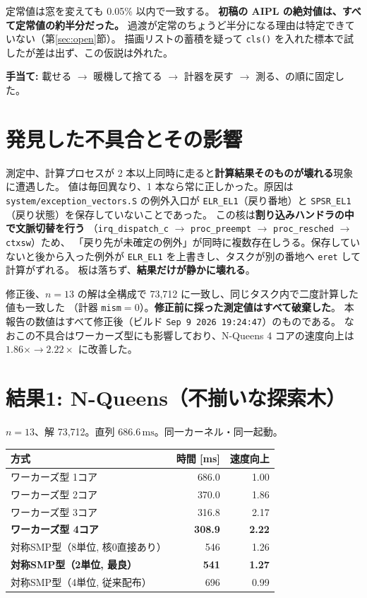 \documentclass[a4paper,11pt]{ltjsarticle}
\begin{document}
\noindent
定常値は窓を変えても 0.05\% 以内で一致する。
\textbf{初稿の AIPL の絶対値は、すべて定常値の約半分だった。}
過渡が定常のちょうど半分になる理由は特定できていない（第\ref{sec:open}節）。
描画リストの蓄積を疑って \texttt{cls()} を入れた標本で試したが差は出ず、この仮説は外れた。

\textbf{手当て:} 載せる $\to$ 暖機して捨てる $\to$ 計器を戻す $\to$ 測る、の順に固定した。

\section{発見した不具合とその影響}\label{sec:bug}

測定中、計算プロセスが 2 本以上同時に走ると\textbf{計算結果そのものが壊れる}現象に遭遇した。
値は毎回異なり、1 本なら常に正しかった。原因は
\texttt{system/exception\_vectors.S} の例外入口が \texttt{ELR\_EL1}（戻り番地）と
\texttt{SPSR\_EL1}（戻り状態）を保存していないことであった。
この核は\textbf{割り込みハンドラの中で文脈切替を行う}
（\texttt{irq\_dispatch\_c} $\to$ \texttt{proc\_preempt} $\to$ \texttt{proc\_resched} $\to$ \texttt{ctxsw}）ため、
「戻り先が未確定の例外」が同時に複数存在しうる。保存していないと後から入った例外が
\texttt{ELR\_EL1} を上書きし、タスクが別の番地へ \texttt{eret} して計算がずれる。
板は落ちず、\textbf{結果だけが静かに壊れる}。

修正後、$n=13$ の解は全構成で 73,712 に一致し、同じタスク内で二度計算した値も一致した
（計器 \texttt{mism}$=0$）。\textbf{修正前に採った測定値はすべて破棄した}。
本報告の数値はすべて修正後（ビルド \texttt{Sep 9 2026 19:24:47}）のものである。
なおこの不具合はワーカーズ型にも影響しており、N-Queens 4 コアの速度向上は
$1.86\times \to 2.22\times$ に改善した。

\section{結果1: N-Queens（不揃いな探索木）}

$n=13$、解 73,712。直列 $686.6\,\mathrm{ms}$。同一カーネル・同一起動。

\begin{center}
\begin{tabular}{lrr}
\toprule
方式 & 時間 [ms] & 速度向上 \\
\midrule
ワーカーズ型 1コア & 686.0 & 1.00 \\
ワーカーズ型 2コア & 370.0 & 1.86 \\
ワーカーズ型 3コア & 316.8 & 2.17 \\
\textbf{ワーカーズ型 4コア} & \textbf{308.9} & \textbf{2.22} \\
\midrule
対称SMP型（8単位, 核0直接あり） & 546 & 1.26 \\
\textbf{対称SMP型（2単位, 最良）} & \textbf{541} & \textbf{1.27} \\
対称SMP型（4単位, 従来配布） & 696 & 0.99 \\
\bottomrule
\end{tabular}
\end{center}
\end{document}
